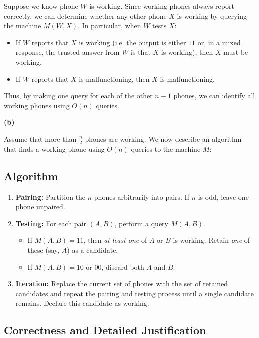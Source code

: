 \documentclass[11pt]{article}
\begin{document}
    Suppose we know  phone \(W\) is working. Since working phones always report correctly, we can determine whether any other phone \(X\) is working by querying the machine \(M(W,X)\). In particular, when \(W\) tests \(X\):
    \begin{itemize}
        \item If \(W\) reports that \(X\) is working (i.e. the output is either \(11\) or, in a mixed response, the trusted answer from \(W\) is that \(X\) is working), then \(X\) must be working.
        \item If \(W\) reports that \(X\) is malfunctioning, then \(X\) is malfunctioning.
    \end{itemize}
    Thus, by making one query for each of the other \(n-1\) phones, we can identify all working phones using \(O(n)\) queries.
    
    \bigskip
    
    \textbf{(b) }
    
    Assume that more than $\frac{n}{2}$ phones are working. We now describe an algorithm that finds a working phone using $O(n)$ queries to the machine $M$:
    \subsection*{Algorithm}
    \begin{enumerate}
        \item \textbf{Pairing:} Partition the $n$ phones arbitrarily into pairs. If $n$ is odd, leave one phone unpaired.
        \item \textbf{Testing:} For each pair $(A,B)$, perform a query $M(A,B)$.
        \begin{itemize}
            \item If $M(A,B) = 11$, then \emph{at least one} of $A$ or $B$ is working. Retain \emph{one} of these (say, $A$) as a candidate.
            \item If $M(A,B) = 10$ or $00$, discard both $A$ and $B$.
        \end{itemize}
        \item \textbf{Iteration:} Replace the current set of phones with the set of retained candidates and repeat the pairing and testing process until a single candidate remains. Declare this candidate as working.
    \end{enumerate}
    
    \subsection*{Correctness and Detailed Justification}
    
\end{document}
